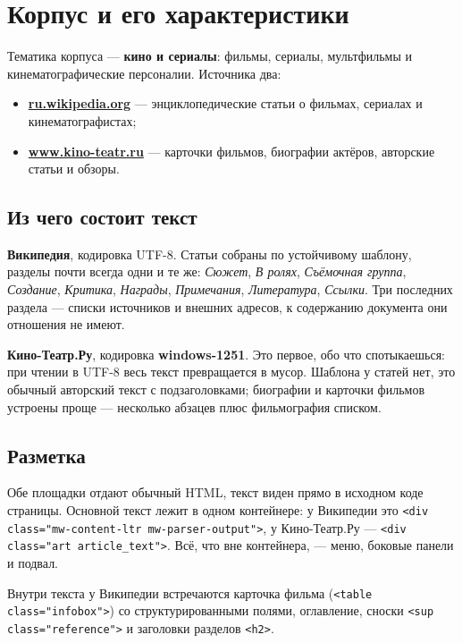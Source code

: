 \section{Корпус и его характеристики}

Тематика корпуса --- \textbf{кино и сериалы}: фильмы, сериалы, мультфильмы и
кинематографические персоналии. Источника два:

\begin{itemize}
    \item \href{https://ru.wikipedia.org/}{\textbf{ru.wikipedia.org}} --- энциклопедические
          статьи о фильмах, сериалах и кинематографистах;
    \item \href{https://www.kino-teatr.ru/}{\textbf{www.kino-teatr.ru}} --- карточки
          фильмов, биографии актёров, авторские статьи и обзоры.
\end{itemize}

\subsection*{Из чего состоит текст}

\textbf{Википедия}, кодировка UTF-8. Статьи собраны по устойчивому шаблону, разделы почти
всегда одни и те же: \emph{Сюжет}, \emph{В ролях}, \emph{Съёмочная группа},
\emph{Создание}, \emph{Критика}, \emph{Награды}, \emph{Примечания}, \emph{Литература},
\emph{Ссылки}. Три последних раздела --- списки источников и внешних адресов, к
содержанию документа они отношения не имеют.

\textbf{Кино-Театр.Ру}, кодировка \textbf{windows-1251}. Это первое, обо что
спотыкаешься: при чтении в UTF-8 весь текст превращается в мусор. Шаблона у статей нет,
это обычный авторский текст с подзаголовками; биографии и карточки фильмов устроены
проще --- несколько абзацев плюс фильмография списком.

\subsection*{Разметка}

Обе площадки отдают обычный HTML, текст виден прямо в исходном коде страницы. Основной
текст лежит в одном контейнере: у Википедии это
\texttt{<div class="mw-content-ltr mw-parser-output">}, у Кино-Театр.Ру ---
\texttt{<div class="art article\_text">}. Всё, что вне контейнера, --- меню, боковые
панели и подвал.

Внутри текста у Википедии встречаются карточка фильма
(\texttt{<table class="infobox">}) со структурированными полями, оглавление, сноски
\texttt{<sup class="reference">} и заголовки разделов \texttt{<h2>}.

